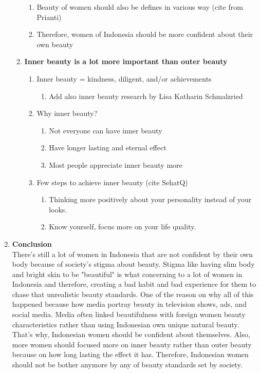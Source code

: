 \documentclass[12pt]{article}
\begin{document}
\begin{enumerate}[label*=\arabic*.]
\begin{enumerate}[label*=\arabic*.]
\begin{enumerate}[label*=\arabic*.]
            \item Beauty of women should also be defines in various way (cite from Prianti)
            \item Therefore, women of Indonesia should be more confident about their own beauty
            \end{enumerate}
        \item \textbf{Inner beauty is a lot more important than outer beauty}
            \begin{enumerate}[label*=\arabic*.]
            \item Inner beauty = kindness, diligent, and/or achievements
                \begin{enumerate}[label*=\arabic*.]
                \item Add also inner beauty research by Lisa Katharin Schmalzried
                \end{enumerate}
            \item Why inner beauty?
                \begin{enumerate}[label*=\arabic*.]
                \item Not everyone can have inner beauty
                \item Have longer lasting and eternal effect
                \item Most people appreciate inner beauty more
                \end{enumerate}
            \item Few steps to achieve inner beauty (cite SehatQ)
                \begin{enumerate}[label*=\arabic*.]
                \item Thinking more positively about your personality instead of your looks.
                \item Know yourself, focus more on your life quality.
                \end{enumerate}
            \end{enumerate}
        \end{enumerate}
    \item {\large\textbf{Conclusion}} \\
            There's still a lot of women in Indonesia that are not confident by their own body because of society's stigma about beauty. Stigma like having slim body and bright skin to be "beautiful" is what concerning to a lot of women in Indonesia and therefore, creating a bad habit and bad experience for them to chase that unrealistic beauty standards. One of the reason on why all of this happened because how media portray beauty in television shows, ads, and social media. Media often linked beautifulness with foreign women beauty characteristics rather than using Indonesian own unique natural beauty. That's why, Indonesian women should be confident about themselves. Also, more women should focused more on inner beauty rather than outer beauty because on how long lasting the effect it has. Therefore, Indonesian women should not be bother anymore by any of beauty standards set by society.
    \end{enumerate}
\end{document}
